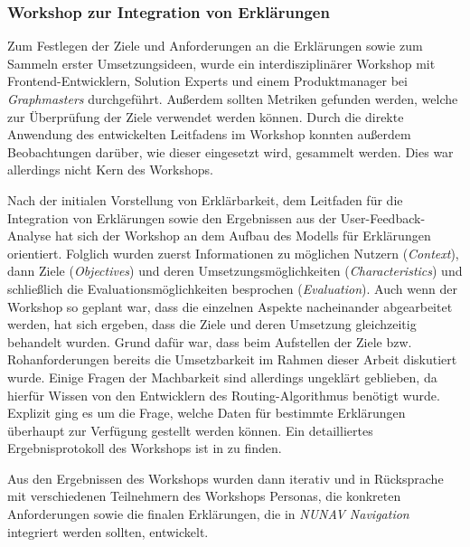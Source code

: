 \subsubsection{Workshop zur Integration von Erklärungen}

Zum Festlegen der Ziele und Anforderungen an die Erklärungen sowie zum Sammeln erster Umsetzungsideen, wurde ein interdisziplinärer Workshop mit Frontend-Entwicklern, \glqq Solution Experts\grqq{} und einem Produktmanager bei \textit{Graphmasters} durchgeführt. Außerdem sollten Metriken gefunden werden, welche zur Überprüfung der Ziele verwendet werden können. Durch die direkte Anwendung des entwickelten Leitfadens im Workshop konnten außerdem Beobachtungen darüber, wie dieser eingesetzt wird, gesammelt werden. Dies war allerdings nicht Kern des Workshops. 

Nach der initialen Vorstellung von Erklärbarkeit, dem Leitfaden für die Integration von Erklärungen sowie den Ergebnissen aus der User-Feedback-Analyse hat sich der Workshop an dem Aufbau des Modells für Erklärungen orientiert. Folglich wurden zuerst Informationen zu möglichen Nutzern (\textit{Context}), dann Ziele (\textit{Objectives}) und deren Umsetzungsmöglichkeiten (\textit{Characteristics}) und schließlich die Evaluationsmöglichkeiten besprochen (\textit{Evaluation}). Auch wenn der Workshop so geplant war, dass die einzelnen Aspekte nacheinander abgearbeitet werden, hat sich ergeben, dass die Ziele und deren Umsetzung gleichzeitig behandelt wurden. Grund dafür war, dass beim Aufstellen der Ziele bzw. Rohanforderungen bereits die Umsetzbarkeit im Rahmen dieser Arbeit diskutiert wurde. Einige Fragen der Machbarkeit sind allerdings ungeklärt geblieben, da hierfür Wissen von den Entwicklern des Routing-Algorithmus benötigt wurde. Explizit ging es um die Frage, welche Daten für bestimmte Erklärungen überhaupt zur Verfügung gestellt werden können. Ein detailliertes Ergebnisprotokoll des Workshops ist in  zu finden.

Aus den Ergebnissen des Workshops wurden dann iterativ und in Rücksprache mit verschiedenen Teilnehmern des Workshops Personas, die konkreten Anforderungen sowie die finalen Erklärungen, die in \textit{NUNAV Navigation} integriert werden sollten, entwickelt.
